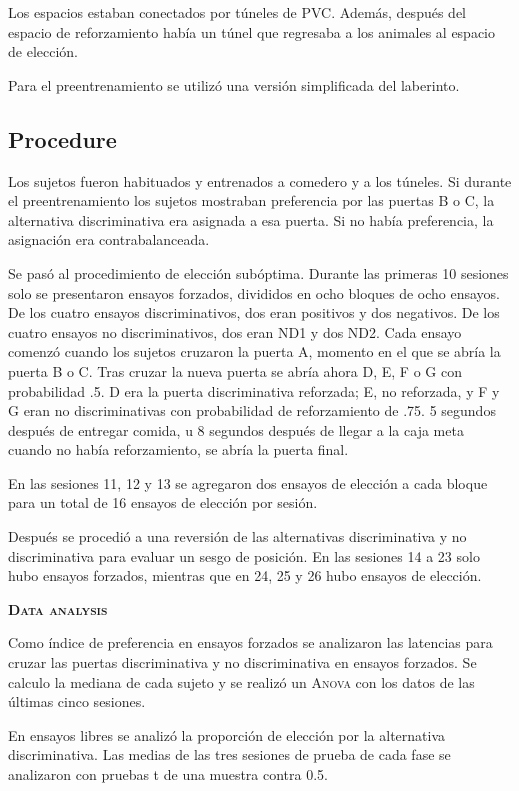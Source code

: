 \documentclass[a4paper,12pt]{article}
\begin{document}
Los espacios estaban conectados por túneles de PVC.
Además, después del espacio de reforzamiento había un túnel que regresaba a los animales al espacio de elección.

Para el preentrenamiento se utilizó una versión simplificada del laberinto.

\subsection{Procedure}

Los sujetos fueron habituados y entrenados a comedero y a los túneles.
Si durante el preentrenamiento los sujetos mostraban preferencia por las puertas B o C, la alternativa discriminativa era asignada a esa puerta.
Si no había preferencia, la asignación era contrabalanceada.

Se pasó al procedimiento de elección subóptima.
Durante las primeras 10 sesiones solo se presentaron ensayos forzados, divididos en ocho bloques de ocho ensayos.
De los cuatro ensayos discriminativos, dos eran positivos y dos negativos.
De los cuatro ensayos no discriminativos, dos eran ND1 y dos ND2.
Cada ensayo comenzó cuando los sujetos cruzaron la puerta A, momento en el que se abría la puerta B o C.
Tras cruzar la nueva puerta se abría ahora D, E, F o G con probabilidad .5.
D era la puerta discriminativa reforzada; E, no reforzada, y F y G eran no discriminativas con probabilidad de reforzamiento de .75.
5 segundos después de entregar comida, u 8 segundos después de llegar a la caja meta cuando no había reforzamiento, se abría la puerta final.

En las sesiones 11, 12 y 13 se agregaron dos ensayos de elección a cada bloque para un total de 16 ensayos de elección por sesión.

Después se procedió a una reversión de las alternativas discriminativa y no discriminativa para evaluar un sesgo de posición.
En las sesiones 14 a 23 solo hubo ensayos forzados, mientras que en 24, 25 y 26 hubo ensayos de elección.

{\noindent\scshape\bfseries Data analysis}

Como índice de preferencia en ensayos forzados se analizaron las latencias para cruzar las puertas discriminativa y no discriminativa en ensayos forzados.
Se calculo la mediana de cada sujeto y se realizó un {\scshape Anova} con los datos de las últimas cinco sesiones.

En ensayos libres se analizó la proporción de elección por la alternativa discriminativa.
Las medias de las tres sesiones de prueba de cada fase se analizaron con pruebas t de una muestra contra 0.5.
\end{document}
